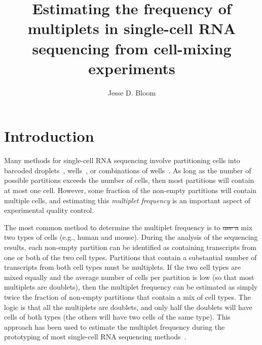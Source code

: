 \documentclass[fleqn,10pt,lineno]{wlpeerj} %
\title{Estimating the frequency of multiplets in single-cell RNA sequencing from cell-mixing experiments}
\author[1]{Jesse D. Bloom}
\affil[1]{Fred Hutch Cancer Research Center, Seattle, WA  98109}
\providecommand{\DIFdeltex}[1]{{\protect\color{red}\sout{#1}}}                      %
\providecommand{\DIFdelbegin}{} %
\providecommand{\DIFdelend}{} %
\providecommand{\DIFdel}[1]{\texorpdfstring{\DIFdeltex{#1}}{}} %
\begin{document}
\flushbottom
\maketitle
\thispagestyle{empty}

\section*{Introduction}

Many methods for single-cell RNA sequencing involve partitioning cells into barcoded droplets~\citep{klein2015droplet,macosko2015highly,zheng2017massively}, wells~\citep{gierahn2017seq}, or combinations of wells~\citep{cao2017comprehensive}.
As long as the number of possible partitions exceeds the number of cells, then most partitions will contain at most one cell.
However, some fraction of the non-empty partitions will contain multiple cells, and estimating this \emph{multiplet frequency} is an important aspect of experimental quality control.

The most common method to determine the multiplet frequency is to \DIFdelbegin \DIFdel{use a }\DIFdelend mix two types of cells (e.g., human and mouse).
During the analysis of the sequencing results, each non-empty partition can be identified as containing transcripts from one or both of the two cell types.
Partitions that contain a substantial number of transcripts from both cell types must be multiplets.
If the two cell types are mixed equally and the average number of cells per partition is low (so that most multiplets are doublets), then the multiplet frequency can be estimated as simply twice the fraction of non-empty partitions that contain a mix of cell types.
The logic is that all the multiplets are doublets, and only half the doublets will have cells of both types (the others will have two cells of the same type).
This approach has been used to estimate the multiplet frequency during the prototyping of most single-cell RNA sequencing methods~\citep{klein2015droplet,macosko2015highly,zheng2017massively,gierahn2017seq,cao2017comprehensive}.
\end{document}
